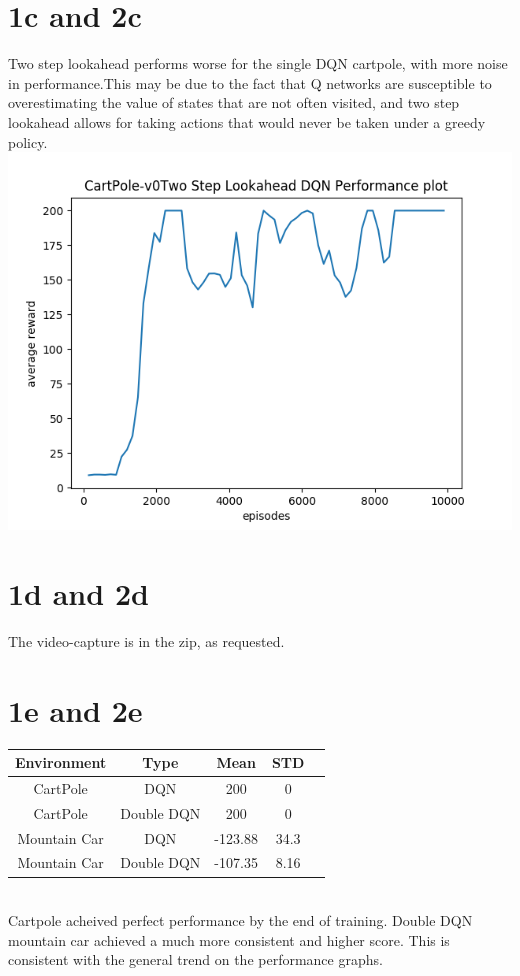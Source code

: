 \documentclass[12pt]{article}
\begin{document}
\begin{solution}
\section{1c and 2c}
Two step lookahead performs worse for the single DQN cartpole, with more noise in performance.This may be due to the fact that Q networks are susceptible to overestimating the value of states that are not often visited, and two step lookahead allows for taking actions that would never be taken under a greedy policy.
\includegraphics[scale=0.5]{Completed_Graphs/Lookahead_SingleQ.png}\\
\section{1d and 2d}
The video-capture is in the zip, as requested.

\section{1e and 2e}
\begin{tabular}{|c|c|c|c|l}
\hline
Environment & Type & Mean & STD   \\ \hline
  CartPole & DQN  & 200  & 0   \\ \hline
  CartPole & Double DQN  & 200  & 0   \\ \hline
  Mountain Car & DQN  & -123.88  & 34.3   \\ \hline
    Mountain Car & Double DQN  & -107.35  & 8.16  \\ \hline
\end{tabular}\\

Cartpole acheived perfect performance by the end of training.  Double DQN mountain car achieved a much more consistent and higher score.  This is consistent with the general trend on the performance graphs.
\end{solution}
\end{document}

